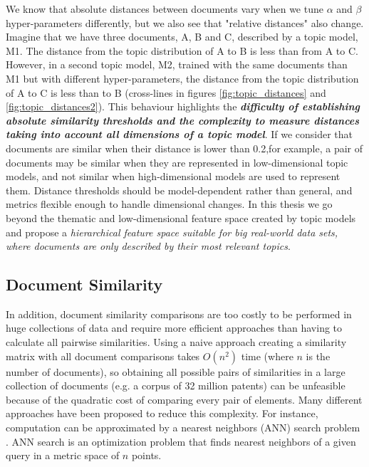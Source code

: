 We know that absolute distances between documents vary when we tune $\alpha$ and $\beta$ hyper-parameters differently, but we also see that "relative distances" also change. Imagine that we have three documents, A, B and C, described by a topic model, M1. The distance from the topic distribution of A to B is less than from A to C. However, in a second topic model, M2, trained with the same documents than M1 but with different hyper-parameters, the distance from the topic distribution of A to C is less than to B (cross-lines in figures \ref{fig:topic_distances} and \ref{fig:topic_distances2}). This behaviour highlights the \textbf{\textit{difficulty of establishing absolute similarity thresholds and the complexity to measure distances taking into account all dimensions of a topic model}}. If we consider that documents are similar when their distance is lower than 0.2,for example, a pair of documents may be similar when they are represented in low-dimensional topic models, and not similar when high-dimensional models are used to represent them. Distance thresholds should be model-dependent rather than general, and metrics flexible enough to handle dimensional changes. In this thesis we go beyond the thematic and low-dimensional feature space created by topic models and propose a \textit{hierarchical feature space suitable for big real-world data sets, where documents are only described by their most relevant topics}.


\subsection{Document Similarity}
\label{sec:document-similarity}

In addition, document similarity comparisons are too costly to be performed in huge collections of data and require more efficient approaches than having to calculate all pairwise similarities. Using a naive approach creating a similarity matrix with all document comparisons takes $O(n^2)$ time (where $n$ is the number of documents), so obtaining all possible pairs of similarities in a large collection of documents (e.g. a corpus of 32 million patents) can be unfeasible because of the quadratic cost of comparing every pair of elements. Many different approaches have been proposed to reduce this complexity. For instance, computation can be approximated by a nearest neighbors (ANN) search problem \citep{Indyk1998}. ANN search is an optimization problem that finds nearest neighbors of a given query in a metric space of $n$ points. 

